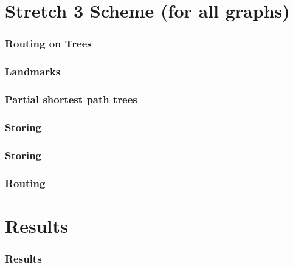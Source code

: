 \documentclass[10pt, compress]{beamer}
\begin{document}
\section{Stretch 3 Scheme (for all graphs)}

\begin{frame}[fragile]
  \frametitle{Routing on Trees}


\end{frame}

\begin{frame}[fragile]
  \frametitle{Landmarks}


\end{frame}

\begin{frame}[fragile]
  \frametitle{Partial shortest path trees}


\end{frame}

\begin{frame}[fragile]
  \frametitle{Storing}


\end{frame}

\begin{frame}[fragile]
  \frametitle{Storing}


\end{frame}

\begin{frame}[fragile]
  \frametitle{Routing}


\end{frame}


\section{Results}

\begin{frame}[fragile]
  \frametitle{Results}


\end{frame}


\end{document}
